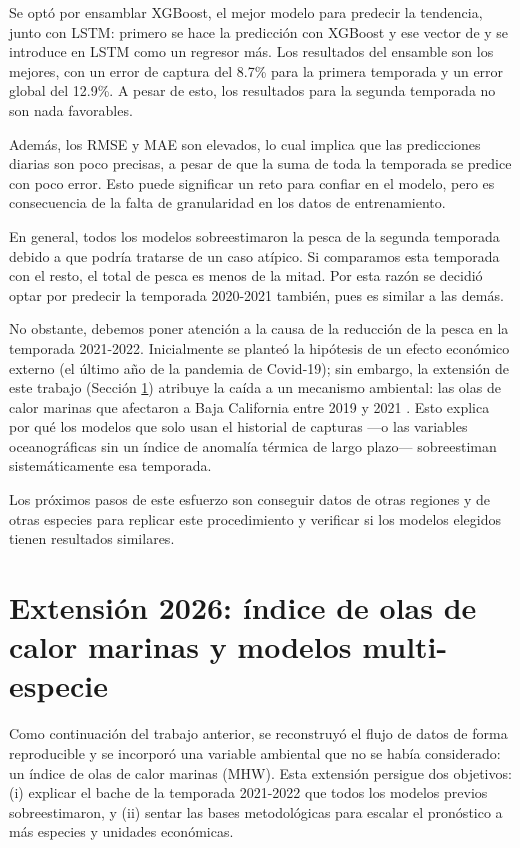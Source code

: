 \documentclass[twoside,11pt]{article}
\begin{document}
Se optó por ensamblar XGBoost, el mejor modelo para predecir la tendencia, junto con LSTM: primero se hace la predicción con XGBoost y ese vector de y se introduce en LSTM como un regresor más. Los resultados del ensamble son los mejores, con un error de captura del 8.7\% para la primera temporada y un error global del 12.9\%. A pesar de esto, los resultados para la segunda temporada no son nada favorables. 

Además, los RMSE y MAE son elevados, lo cual implica que las predicciones diarias son poco precisas, a pesar de que la suma de toda la temporada se predice con poco error. Esto puede significar un reto para confiar en el modelo, pero es consecuencia de la falta de granularidad en los datos de entrenamiento.

En general, todos los modelos sobreestimaron la pesca de la segunda temporada debido a que podría tratarse de un caso atípico. Si comparamos esta temporada con el resto, el total de pesca es menos de la mitad. Por esta razón se decidió optar por predecir la temporada 2020-2021 también, pues es similar a las demás.

No obstante, debemos poner atención a la causa de la reducción de la pesca en la temporada 2021-2022. Inicialmente se planteó la hipótesis de un efecto económico externo (el último año de la pandemia de Covid-19); sin embargo, la extensión de este trabajo (Sección \ref{sec:extension2026}) atribuye la caída a un mecanismo ambiental: las olas de calor marinas que afectaron a Baja California entre 2019 y 2021 \cite{villasenor2024}. Esto explica por qué los modelos que solo usan el historial de capturas —o las variables oceanográficas sin un índice de anomalía térmica de largo plazo— sobreestiman sistemáticamente esa temporada.

Los próximos pasos de este esfuerzo son conseguir datos de otras regiones y de otras especies para replicar este procedimiento y verificar si los modelos elegidos tienen resultados similares.

\section{Extensión 2026: índice de olas de calor marinas y modelos multi-especie}
\label{sec:extension2026}

Como continuación del trabajo anterior, se reconstruyó el flujo de datos de forma reproducible y se incorporó una variable ambiental que no se había considerado: un índice de olas de calor marinas (MHW). Esta extensión persigue dos objetivos: (i) explicar el bache de la temporada 2021-2022 que todos los modelos previos sobreestimaron, y (ii) sentar las bases metodológicas para escalar el pronóstico a más especies y unidades económicas.
\end{document}
